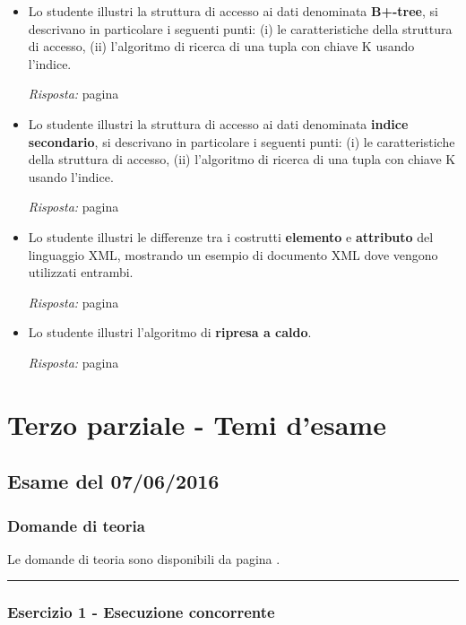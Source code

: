 \documentclass[a4paper]{article}
\newcommand{\longline}{\noindent\rule{\textwidth}{0.4pt}}
\begin{document}
\begin{itemize}
		\item Lo studente illustri la struttura di accesso ai dati denominata \textbf{B+-tree}, si descrivano in particolare i seguenti punti: (i) le caratteristiche della struttura di accesso, (ii) l'algoritmo di ricerca di una tupla con chiave K usando l'indice.
		
		\emph{Risposta:} pagina \pageref{dom: B+-tree}
		
		\item Lo studente illustri la struttura di accesso ai dati denominata \textbf{indice secondario}, si descrivano in particolare i seguenti punti: (i) le caratteristiche della struttura di accesso, (ii) l'algoritmo di ricerca di una tupla con chiave K usando l'indice.
		
		\emph{Risposta:} pagina \pageref{dom: indice secondario}
		
		\item Lo studente illustri le differenze tra i costrutti \textbf{elemento} e \textbf{attributo} del linguaggio XML, mostrando un esempio di documento XML dove vengono utilizzati entrambi.
		
		\emph{Risposta:} pagina \pageref{dom: elemento e attributo in XML}
		
		\item Lo studente illustri l'algoritmo di \textbf{ripresa a caldo}.
		
		\emph{Risposta:} pagina \pageref{dom: ripresa a caldo}
	\end{itemize}\newpage
	
	\section{Terzo parziale - Temi d'esame}
	
	\subsection{Esame del 07/06/2016}
	
	\subsubsection{Domande di teoria}
	
	Le domande di teoria sono disponibili da pagina \pageref{dom: gestione dei guasti}.
	
	\longline
	
	\subsubsection{Esercizio 1 - Esecuzione concorrente}
	
\end{document}
